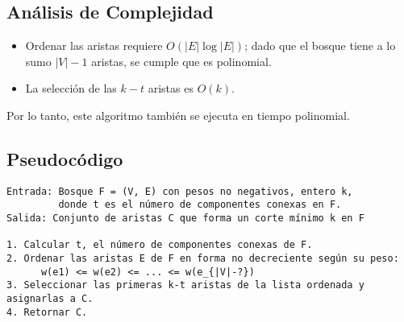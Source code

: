 \subsection{Análisis de Complejidad}
\begin{itemize}
    \item Ordenar las aristas requiere \( O(|E| \log |E|) \); dado que el bosque tiene a lo sumo \( |V|-1 \) aristas, se cumple que es polinomial.
    \item La selección de las \( k-t \) aristas es \( O(k) \).
\end{itemize}
Por lo tanto, este algoritmo también se ejecuta en tiempo polinomial.

\subsection{Pseudocódigo}

\begin{lstlisting}
Entrada: Bosque F = (V, E) con pesos no negativos, entero k, 
         donde t es el número de componentes conexas en F.
Salida: Conjunto de aristas C que forma un corte mínimo k en F

1. Calcular t, el número de componentes conexas de F.
2. Ordenar las aristas E de F en forma no decreciente según su peso:
      w(e1) <= w(e2) <= ... <= w(e_{|V|-?})
3. Seleccionar las primeras k-t aristas de la lista ordenada y asignarlas a C.
4. Retornar C.
\end{lstlisting}

